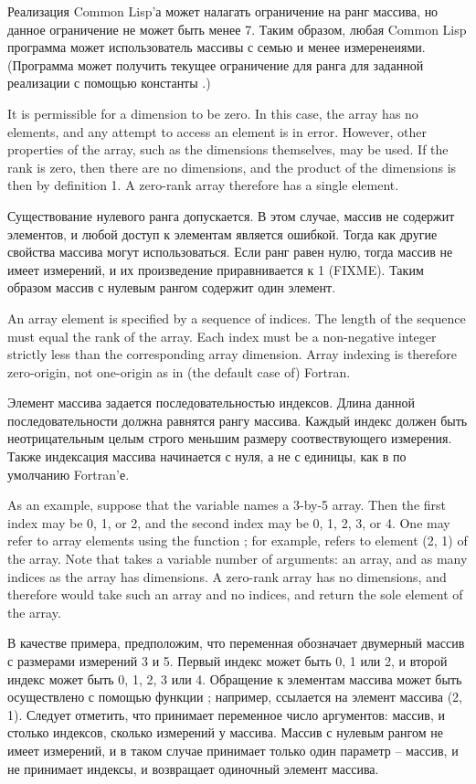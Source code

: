 Реализация Common Lisp'а может налагать ограничение на ранг массива, но данное
ограничение не может быть менее 7. Таким образом, любая Common Lisp программа
может использователь массивы с семью и менее измеренеиями.
(Программа может получить текущее ограничение для ранга для заданной реализации
с помощью константы .)

It is permissible for a dimension to be zero.  In this case,
the array has no elements, and any attempt to access an element
is in error.  However, other properties of the array, such as the
dimensions themselves, may be used.
If the rank is zero, then there are no dimensions, and the
product of the dimensions is then by definition 1.
A zero-rank array therefore has a single element.

Существование нулевого ранга допускается. В этом случае, массив не содержит
элементов, и любой доступ к элементам является ошибкой. Тогда как другие
свойства массива могут использоваться. Если ранг равен нулю, тогда массив не
имеет измерений, и их произведение приравнивается к 1 (FIXME).
Таким образом массив с нулевым рангом содержит один элемент.

An array element is specified by a sequence of indices.
The length of the sequence must equal the rank of the array.
Each index must be a non-negative integer strictly less than
the corresponding array dimension.  Array indexing is
therefore zero-origin, not one-origin as in (the default case of)
Fortran.

Элемент массива задается последовательностью индексов.
Длина данной последовательности должна равнятся рангу массива.
Каждый индекс должен быть неотрицательным целым строго меньшим размеру
соотвествующего измерения. Также индексация массива начинается с нуля, а не с
единицы, как в по умолчанию Fortran'е.

As an example, suppose that the variable  names a 3-by-5 array.
Then the first index may be 0, 1, or 2, and the second index
may be 0, 1, 2, 3, or 4.  One may refer to array elements using
the function ; for example, 
refers to element (2, 1) of the array.  Note that  takes
a variable number of arguments: an array, and as many indices
as the array has dimensions.
A zero-rank array has no dimensions, and therefore
 would take such an array and no indices, and return the sole
element of the array.

В качестве примера, предположим, что переменная  обозначает двумерный
массив с размерами измерений 3 и 5. Первый индекс может быть 0, 1 или 2, и второй
индекс может быть 0, 1, 2, 3 или 4. Обращение к элементам массива может быть
осуществлено с помощью функции ; например, 
ссылается на элемент массива (2, 1). Следует отметить, что  принимает
переменное число аргументов: массив, и столько индексов, сколько измерений у
массива.
Массив с нулевым рангом не имеет измерений, и в таком случае  принимает
только один параметр -- массив, и не принимает индексы, и возвращает одиночный
элемент массива.

